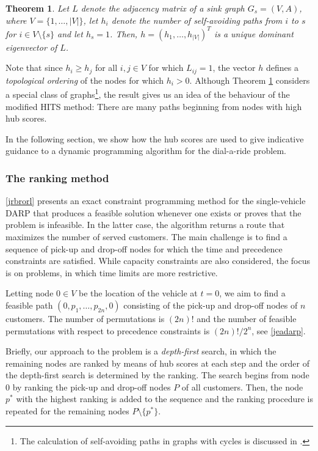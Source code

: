 \documentclass[dissertation,draft*]{aaltoseries}
\newtheorem{theorem}{Theorem}
\begin{document}
\begin{theorem}
\label{polut}
Let $L$ denote the adjacency matrix of a sink graph $G_s=(V,A)$, where $V=\{1,\ldots,|V|\}$,  
let $h_i$ denote the number of self-avoiding paths from $i$ to $s$ for $i \in V \setminus \{s\}$ and let $h_s=1$. 
Then, $h=(h_1,\ldots,h_{|V|})^T$ is a unique dominant eigenvector of $L$.
\end{theorem}

Note that since $h_i \geq h_j$ for all $i,j \in V$ for which $L_{ij} = 1$, the vector $h$ defines a \emph{topological
ordering} \cite{cormen} of the nodes for which $h_i > 0$.
Although Theorem \ref{polut} considers a special class of 
graphs\footnote{The calculation of self-avoiding paths in graphs with cycles is discussed in \cite{ponstein}.}, 
the result gives us an idea of the behaviour of the modified HITS method: There are many paths beginning from 
nodes with high hub scores. 

In the following section, we show how the 
hub scores are used to give indicative guidance to 
a dynamic programming algorithm for the dial-a-ride problem.

\subsubsection{The ranking method}
\label{svsolution}
\ref{jrbrorl} presents an exact constraint programming method for the single-vehicle DARP that 
produces a feasible solution whenever one exists or proves that the problem is infeasible.
In the latter case, the algorithm returns a route that maximizes the number of served customers.
The main challenge is to find a sequence of pick-up and drop-off nodes for which 
the time and precedence constraints are satisfied. While capacity constraints are 
also considered, the focus is on problems, in which time limits are more restrictive.

Letting node $0 \in V$ be the location of the vehicle at $t=0$,
we aim to find a feasible path $(0,p_1,\ldots,p_{2n},0)$
consisting of the pick-up and drop-off nodes of $n$ customers.
The number of permutations is $(2n)!$ and the number of feasible permutations
with respect to precedence constraints is $(2n)!/2^n$, see \ref{jeadarp}.

Briefly, our approach to the problem is a \emph{depth-first} search, in which the
remaining nodes are ranked by means of hub scores at each step and the order of the depth-first search is determined by the 
ranking. %
The search begins from node $0$ by ranking the pick-up and drop-off nodes $P$ of all customers.
Then, the node $p^{*}$ with the highest ranking is added to the sequence and the ranking procedure is
repeated for the remaining nodes $P \setminus \{p^{*}\}$.
\end{document}
